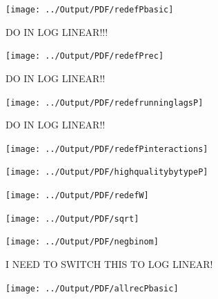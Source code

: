 \documentclass[12pt] {article}
\begin{document}
\pagebreak{}
\begin{table}
\caption{}
\label{Flo:Poisson Basic}\texttt{[image: ../Output/PDF/redefPbasic]}
\end{table}

\clearpage{}
\pagebreak{}
\begin{table}
\caption{DO IN LOG LINEAR!!!}
\label{Flo:Poisson Rec&Mort}\texttt{[image: ../Output/PDF/redefPrec]}
\end{table}


\clearpage{}
\pagebreak{}
\begin{table}
\caption{DO IN LOG LINEAR!!}
\label{Flo:Cumulative LagsP}\texttt{[image: ../Output/PDF/redefrunninglagsP]}
\end{table}

\clearpage{}
\pagebreak{}
\begin{table}
\caption{DO IN LOG LINEAR!!}
\label{Flo:Poisson Interactions}\texttt{[image: ../Output/PDF/redefPinteractions]}
\end{table}

\pagebreak{}
\begin{table}
\caption{}
\label{Flo: Recs by QualityP}\texttt{[image: ../Output/PDF/highqualitybytypeP]}
\end{table}

\pagebreak{}
\begin{table}
\caption{}
\label{Flo:County-basic}\texttt{[image: ../Output/PDF/redefW]}
\end{table}


\pagebreak{}
\clearpage{}
\begin{table}
\caption{}
\label{Flo:sqrt}
\texttt{[image: ../Output/PDF/sqrt]}
\end{table}

\pagebreak{}
\clearpage{}
\begin{table}
\caption{}
\label{Flo:negbinom}
\texttt{[image: ../Output/PDF/negbinom]}
\end{table}

\pagebreak{}
\clearpage{}
\begin{table}
\caption{I NEED TO SWITCH THIS TO LOG LINEAR!}
\label{Flo:allrecruits}
\texttt{[image: ../Output/PDF/allrecPbasic]}
\end{table}
\end{document}
